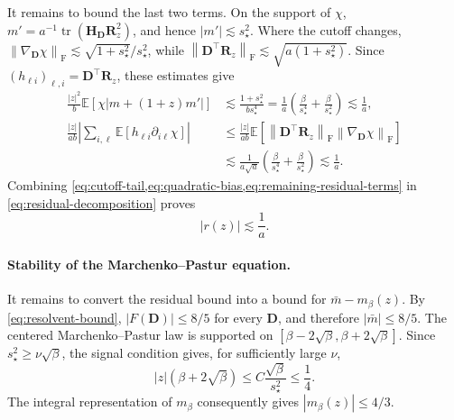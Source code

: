 \documentclass[11pt]{article}
\newcommand{\trans}{\top}
\DeclareMathOperator{\tr}{tr}
\newcommand{\frn}[1]{\left\lVert #1\right\rVert_{\mathrm{F}}}
\begin{document}
It remains to bound the last two terms. On the support of $\chi$,
$m'=a^{-1}\tr(\bm H_{\bm D}\bm R_z^2)$, and hence
$|m'|\lesssim s_\star^2$. Where the cutoff changes,
$\frn{\nabla_{\bm D}\chi}
\lesssim\sqrt{1+s_\star^2}/s_\star^2$, while
$\frn{\bm D^\trans\bm R_z}
\lesssim\sqrt{a(1+s_\star^2)}$. Since
$(h_{\ell i})_{\ell,i}=\bm D^\trans\bm R_z$, these estimates give
\begin{equation}
\label{eq:remaining-residual-terms}
\begin{aligned}
  \frac{|z|^2}{b}
  \mathbb E\left[
    \chi|m+(1+z)m'|
  \right]
  &\lesssim
  \frac{1+s_\star^2}{bs_\star^4}
  =
  \frac1a
  \left(
    \frac{\beta}{s_\star^4}
    +
    \frac{\beta}{s_\star^2}
  \right)
  \lesssim
  \frac1a,\\
  \frac{|z|}{ab}
  \left|
    \sum_{i,\ell}
    \mathbb E\left[
      h_{\ell i}\partial_{i\ell}\chi
    \right]
  \right|
  &\le
  \frac{|z|}{ab}
  \mathbb E\left[
    \frn{\bm D^\trans\bm R_z}
    \frn{\nabla_{\bm D}\chi}
  \right] \\
  &\lesssim
  \frac{1}{a\sqrt a}
  \left(
    \frac{\beta}{s_\star^4}
    +
    \frac{\beta}{s_\star^2}
  \right)
  \lesssim
  \frac1a.
\end{aligned}
\end{equation}
Combining
\cref{eq:cutoff-tail,eq:quadratic-bias,eq:remaining-residual-terms} in
\cref{eq:residual-decomposition} proves
\begin{equation}
\label{eq:residual-bound}
  |r(z)|
  \lesssim
  \frac1a.
\end{equation}

\paragraph{Stability of the Marchenko--Pastur equation.}
It remains to convert the residual bound into a bound for
$\bar m-m_\beta(z)$. By \cref{eq:resolvent-bound},
$|F(\bm D)|\le8/5$ for every $\bm D$, and therefore
$|\bar m|\le8/5$. The centered Marchenko--Pastur law is supported on
$[\beta-2\sqrt\beta,\beta+2\sqrt\beta]$. Since
$s_\star^2\ge\nu\sqrt\beta$, the signal condition gives, for sufficiently
large $\nu$,
\[
  |z|(\beta+2\sqrt\beta)
  \le
  C\frac{\sqrt\beta}{s_\star^2}
  \le\frac14.
\]
The integral representation of $m_\beta$ consequently gives
$|m_\beta(z)|\le4/3$.
\end{document}
